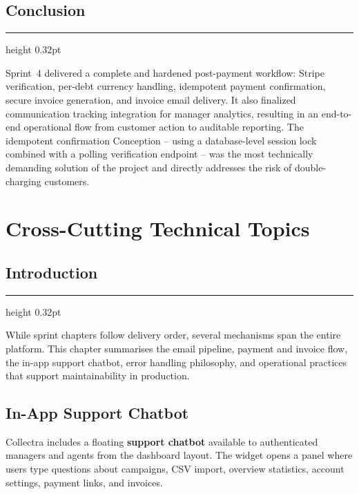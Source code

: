 \documentclass[12pt,a4paper]{report}
\newcommand{\sectionrule}{%
  \vspace{-1pt}%
  {\color{accentblue!22}\hrule height 0.32pt}%
  \vspace{5pt}%
}
\begin{document}
\section*{Conclusion}
{}
\sectionrule

Sprint~4 delivered a complete and hardened post-payment workflow: Stripe verification,
per-debt currency handling, idempotent payment confirmation, secure invoice generation,
and invoice email delivery.
It also finalized communication tracking integration for manager analytics, resulting
in an end-to-end operational flow from customer action to auditable reporting.
The idempotent confirmation Conception -- using a database-level session lock combined
with a polling verification endpoint -- was the most technically demanding solution
of the project and directly addresses the risk of double-charging customers.

\clearpage

\chapter{Cross-Cutting Technical Topics}
\label{chap:crosscutting}

\section*{Introduction}
{}
\sectionrule

While sprint chapters follow delivery order, several mechanisms span the entire
platform.
This chapter summarises the email pipeline, payment and invoice flow, the in-app
support chatbot, error handling philosophy, and operational practices that support
maintainability in production.

\section{In-App Support Chatbot}

Collectra includes a floating \textbf{support chatbot} available to authenticated
managers and agents from the dashboard layout.
The widget opens a panel where users type questions about campaigns, CSV import,
overview statistics, account settings, payment links, and invoices.
\end{document}
